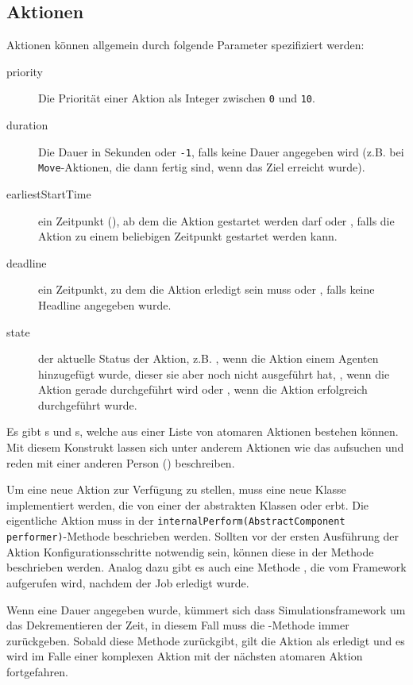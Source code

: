 \subsection{Aktionen}\label{subsec:concept_actions}
Aktionen können allgemein durch folgende Parameter spezifiziert werden:
\begin{description}
	\item[priority] Die Priorität einer Aktion als Integer zwischen \texttt{0} und \texttt{10}.
	\item[duration] Die Dauer in Sekunden oder \texttt{-1}, falls keine Dauer angegeben wird (z.B. bei \texttt{Move}-Aktionen, die dann fertig sind, wenn das Ziel erreicht wurde).
	\item[earliestStartTime] ein Zeitpunkt (), ab dem die Aktion gestartet werden darf oder , falls die Aktion zu einem beliebigen Zeitpunkt gestartet werden kann.
	\item[deadline] ein Zeitpunkt, zu dem die Aktion erledigt sein muss oder , falls keine Headline angegeben wurde.
	\item[state] der aktuelle Status der Aktion, z.B. , wenn die Aktion einem Agenten hinzugefügt wurde, dieser sie aber noch nicht ausgeführt hat, , wenn die Aktion gerade durchgeführt wird oder , wenn die Aktion erfolgreich durchgeführt wurde.
\end{description}
Es gibt s und s, welche aus einer Liste von atomaren Aktionen bestehen können. Mit diesem Konstrukt lassen sich unter anderem Aktionen wie das aufsuchen und reden mit einer anderen Person () beschreiben.

Um eine neue Aktion zur Verfügung zu stellen, muss eine neue Klasse implementiert werden, die von einer der abstrakten Klassen  oder  erbt. Die eigentliche Aktion muss in der \texttt{internalPerform(AbstractComponent performer)}-Methode beschrieben werden. Sollten vor der ersten Ausführung der Aktion Konfigurationsschritte notwendig sein, können diese in der Methode  beschrieben werden. Analog dazu gibt es auch eine Methode , die vom Framework aufgerufen wird, nachdem der Job erledigt wurde.

Wenn eine Dauer angegeben wurde, kümmert sich dass Simulationsframework um das Dekrementieren der Zeit, in diesem Fall muss die -Methode immer  zurückgeben. Sobald diese Methode  zurückgibt, gilt die Aktion als erledigt und es wird im Falle einer komplexen Aktion mit der nächsten atomaren Aktion fortgefahren.

